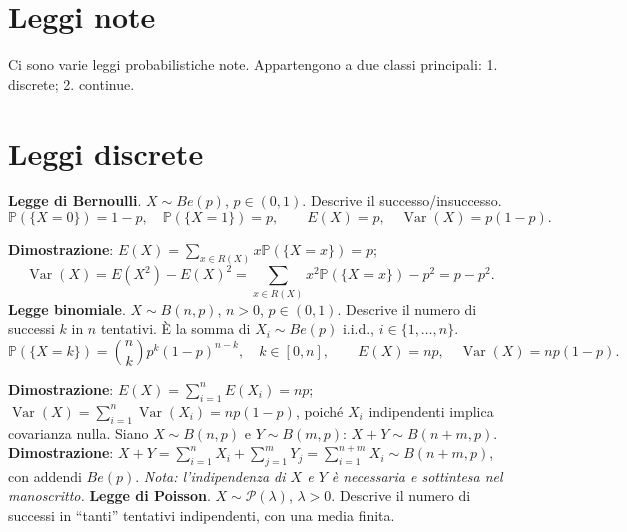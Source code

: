\documentclass[11pt,a4paper]{article}
\newcommand{\pagina}[1]{\clearpage}
\begin{document}
\section*{Leggi note}
Ci sono varie leggi probabilistiche note. Appartengono a due classi principali: 1. discrete; 2. continue.
\pagina{24}\section*{Leggi discrete}
\textbf{Legge di Bernoulli}. $X\sim Be(p)$, $p\in(0,1)$. Descrive il successo/insuccesso.
\[\boxed{\mathbb P(\{X=0\})=1-p,\quad\mathbb P(\{X=1\})=p},\qquad\boxed{E(X)=p,\quad\operatorname{Var}(X)=p(1-p)}.\]
\begin{center}\end{center}
\textbf{Dimostrazione}: $E(X)=\sum_{x\in R(X)}x\mathbb P(\{X=x\})=p$;
\[\operatorname{Var}(X)=E(X^2)-E(X)^2=\sum_{x\in R(X)}x^2\mathbb P(\{X=x\})-p^2=p-p^2.\]
\textbf{Legge binomiale}. $X\sim B(n,p)$, $n>0$, $p\in(0,1)$. Descrive il numero di successi $k$ in $n$ tentativi. È la somma di $X_i\sim Be(p)$ i.i.d., $i\in\{1,\ldots,n\}$.
\[\boxed{\mathbb P(\{X=k\})=\binom nkp^k(1-p)^{n-k}},\quad k\in[0,n],\qquad\boxed{E(X)=np,\quad\operatorname{Var}(X)=np(1-p)}.\]
\begin{center}\end{center}
\textbf{Dimostrazione}: $E(X)=\sum_{i=1}^nE(X_i)=np$; $\operatorname{Var}(X)=\sum_{i=1}^n\operatorname{Var}(X_i)=np(1-p)$, poiché $X_i$ indipendenti implica covarianza nulla.
Siano $X\sim B(n,p)$ e $Y\sim B(m,p)$: $X+Y\sim B(n+m,p)$.
\textbf{Dimostrazione}: $X+Y=\sum_{i=1}^nX_i+\sum_{j=1}^mY_j=\sum_{i=1}^{n+m}X_i\sim B(n+m,p)$, con addendi $Be(p)$.
\emph{Nota: l'indipendenza di $X$ e $Y$ è necessaria e sottintesa nel manoscritto.}
\pagina{25}\textbf{Legge di Poisson}. $X\sim\mathcal P(\lambda)$, $\lambda>0$. Descrive il numero di successi in ``tanti'' tentativi indipendenti, con una media finita.
\end{document}

